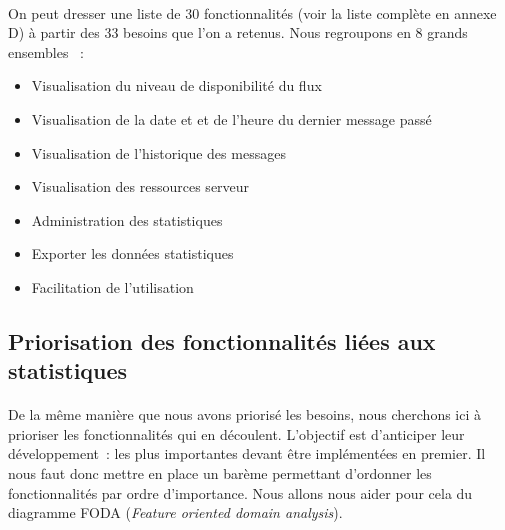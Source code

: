 			\paragraph{}%
			On peut dresser une liste de 30 fonctionnalités (voir la liste
			complète en annexe D) à partir des 33 besoins que l'on a retenus. Nous
			regroupons en 8 grands ensembles \label{ensembles_fonctios}~:
			\begin{itemize}
			  \item Visualisation du niveau de disponibilité du flux
			  \item Visualisation de la date et et de l'heure du dernier message passé
			  \item Visualisation de l’historique des messages
			  \item Visualisation des ressources serveur
			  \item Administration des statistiques
			  \item Exporter les données statistiques
			  \item Facilitation de l’utilisation
			\end{itemize}
			
		\subsection{Priorisation des fonctionnalités liées aux statistiques}
			\paragraph{}%
			De la même manière que nous avons priorisé les besoins, nous cherchons ici à
			prioriser les fonctionnalités qui en découlent. L'objectif est
			d'anticiper leur développement~: les plus importantes
			devant être implémentées en premier. Il nous faut donc mettre en place un
			barème permettant d'ordonner les fonctionnalités par ordre d'importance. Nous
			allons nous aider pour cela du diagramme FODA (\textit{Feature oriented
			domain analysis}).
			
